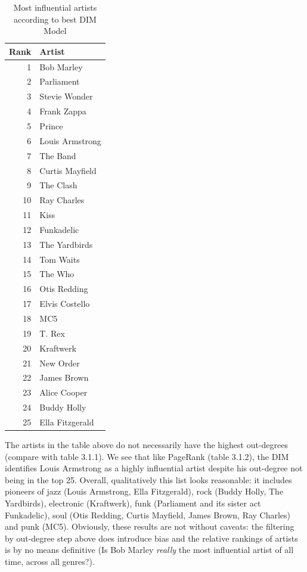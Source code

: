 \begin{table}[H]
\centering
\caption{Most influential artists according to best DIM Model}
\label{my-label}
\begin{tabular}{rl}
\hline
   Rank & Artist          \\
\hline
      1 & Bob Marley      \\
      2 & Parliament      \\
      3 & Stevie Wonder   \\
      4 & Frank Zappa     \\
      5 & Prince          \\
      6 & Louis Armstrong \\
      7 & The Band        \\
      8 & Curtis Mayfield \\
      9 & The Clash       \\
     10 & Ray Charles     \\
     11 & Kiss            \\
     12 & Funkadelic      \\
     13 & The Yardbirds   \\
     14 & Tom Waits       \\
     15 & The Who         \\
     16 & Otis Redding    \\
     17 & Elvis Costello  \\
     18 & MC5             \\
     19 & T. Rex          \\
     20 & Kraftwerk       \\
     21 & New Order       \\
     22 & James Brown     \\
     23 & Alice Cooper    \\
     24 & Buddy Holly     \\
     25 & Ella Fitzgerald \\
\hline
\end{tabular}
\end{table}

The artists in the table above do not necessarily have the highest out-degrees (compare with table 3.1.1). We see that like PageRank (table 3.1.2), the DIM identifies Louis Armstrong as a highly influential artist despite his out-degree not being in the top 25. Overall, qualitatively this list looks reasonable: it includes pioneers of jazz (Louis Armstrong, Ella Fitzgerald), rock (Buddy Holly, The Yardbirds), electronic (Kraftwerk), funk (Parliament and its sister act Funkadelic), soul (Otis Redding, Curtis Mayfield, James Brown, Ray Charles) and punk (MC5). Obviously, these results are not without caveats: the filtering by out-degree step above does introduce bias and the relative rankings of artists is by no means definitive (Is Bob Marley \textit{really} the most influential artist of all time, across all genres?).

